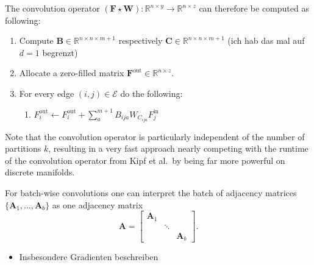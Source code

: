 \documentclass[pdftex,10pt,a4paper]{scrartcl}
\begin{document}
The convolution operator $(\mathbf{F} \star \mathbf{W}) \colon \mathbb{R}^{n \times y} \to \mathbb{R}^{n \times z}$ can therefore be computed as following:
\begin{enumerate}
  \item Compute $\mathbf{B} \in \mathbb{R}^{n \times n \times m + 1}$ respectively $\mathbf{C} \in \mathbb{R}^{n \times n \times m + 1}$ (ich hab das mal auf $d = 1$ begrenzt)
  \item Allocate a zero-filled matrix $\mathbf{F}^{\mathrm{out}} \in \mathbb{R}^{n \times z}$.
  \item For every edge $(i, j) \in \mathcal{E}$ do the following:
  \begin{enumerate}
    \item $F^{\mathrm{out}}_i \leftarrow F^{\mathrm{out}}_i + \sum_a^{m+1} B_{ija} W_{C_{ija}} F^{\mathrm{in}}_j$
  \end{enumerate}
\end{enumerate}
Note that the convolution operator is particularly independent of the number of partitions $k$, resulting in a very fast approach nearly competing with the runtime of the convolution operator from Kipf et al.\ by being far more powerful on discrete manifolds.

For batch-wise convolutions one can interpret the batch of adjacency matrices $\{ \mathbf{A}_1, \ldots, \mathbf{A}_b \}$ as one adjacency matrix
\begin{equation*}
  \mathbf{A} = \begin{bmatrix}
    \mathbf{A}_1 & & \\
    & \ddots &  \\
    & & \mathbf{A}_b
  \end{bmatrix}.
\end{equation*}









\newpage


\begin{itemize}
  \item Insbesondere Gradienten beschreiben
\end{itemize}
\end{document}
